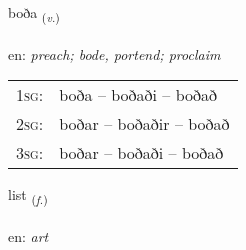\documentclass[frontgrid, backgrid]{flacards}\usepackage[]{graphicx}\usepackage[]{color}
\begin{document}
\renewcommand{\flhead}{\vskip5pt \fboxsep=0pt {\small\bfseries\footnotesize Sagnorð | Verb}}
\renewcommand{\fcfoot}{\vskip5pt \fboxsep=0pt \hspace{2pt}{\small\bfseries\footnotesize 2K}}

\renewcommand{\blhead}{\vskip5pt {\small\bfseries\footnotesize Sagnorð | Verb }}
\renewcommand{\bcfoot}{\vskip5pt \hspace{2pt}{\small\bfseries\footnotesize 2K}}


{boða \small{\textsubscript{(\textit{v.})}} \\[1ex] %
\textphonetic{[pɔːða]} \\
en: \emph{preach; bode, portend; proclaim} \\  [2ex]
\renewcommand*{\arraystretch}{0.8}
\begin{tabular}{p{1cm}l}
\textsc{1sg}: & boða -- boðaði -- boðað \\ 
\textsc{2sg}: & boðar -- boðaðir -- boðað \\ 
\textsc{3sg}: & boðar -- boðaði -- boðað \\ 
\end{tabular}
}

\renewcommand{\flhead}{\vskip5pt \fboxsep=0pt {\small\bfseries\footnotesize Nafnorð | Noun}}
\renewcommand{\fcfoot}{\vskip5pt \fboxsep=0pt \hspace{2pt}{\small\bfseries\footnotesize 2K}}

\renewcommand{\blhead}{\vskip5pt {\small\bfseries\footnotesize Nafnorð | Noun }}
\renewcommand{\bcfoot}{\vskip5pt \hspace{2pt}{\small\bfseries\footnotesize 2K}}


{list \small{\textsubscript{(\textit{f.})}} \\[1ex] %
\textphonetic{[lɪst]} \\
en: \emph{art} \\  [2ex]
\renewcommand*{\arraystretch}{0.8}
}
\end{document}
